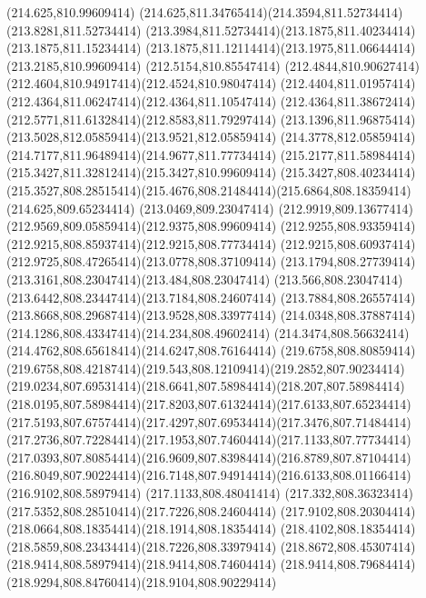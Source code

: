 {{	\lineto(214.625,810.99609414)
	\curveto(214.625,811.34765414)(214.3594,811.52734414)(213.8281,811.52734414)
	\curveto(213.3984,811.52734414)(213.1875,811.40234414)(213.1875,811.15234414)
	\curveto(213.1875,811.12114414)(213.1975,811.06644414)(213.2185,810.99609414)
	\lineto(212.5154,810.85547414)
	\curveto(212.4844,810.90627414)(212.4604,810.94917414)(212.4524,810.98047414)
	\curveto(212.4404,811.01957414)(212.4364,811.06247414)(212.4364,811.10547414)
	\curveto(212.4364,811.38672414)(212.5771,811.61328414)(212.8583,811.79297414)
	\curveto(213.1396,811.96875414)(213.5028,812.05859414)(213.9521,812.05859414)
	\curveto(214.3778,812.05859414)(214.7177,811.96489414)(214.9677,811.77734414)
	\curveto(215.2177,811.58984414)(215.3427,811.32812414)(215.3427,810.99609414)
	\lineto(215.3427,808.40234414)
	\curveto(215.3527,808.28515414)(215.4676,808.21484414)(215.6864,808.18359414)
	\closepath
	\moveto(214.625,809.65234414)
	\lineto(213.0469,809.23047414)
	\curveto(212.9919,809.13677414)(212.9569,809.05859414)(212.9375,808.99609414)
	\curveto(212.9255,808.93359414)(212.9215,808.85937414)(212.9215,808.77734414)
	\curveto(212.9215,808.60937414)(212.9725,808.47265414)(213.0778,808.37109414)
	\curveto(213.1794,808.27739414)(213.3161,808.23047414)(213.484,808.23047414)
	\curveto(213.566,808.23047414)(213.6442,808.23447414)(213.7184,808.24607414)
	\curveto(213.7884,808.26557414)(213.8668,808.29687414)(213.9528,808.33977414)
	\curveto(214.0348,808.37887414)(214.1286,808.43347414)(214.234,808.49602414)
	\curveto(214.3474,808.56632414)(214.4762,808.65618414)(214.6247,808.76164414)
	\closepath
	\moveto(219.6758,808.80859414)
	\curveto(219.6758,808.42187414)(219.543,808.12109414)(219.2852,807.90234414)
	\curveto(219.0234,807.69531414)(218.6641,807.58984414)(218.207,807.58984414)
	\curveto(218.0195,807.58984414)(217.8203,807.61324414)(217.6133,807.65234414)
	\curveto(217.5193,807.67574414)(217.4297,807.69534414)(217.3476,807.71484414)
	\curveto(217.2736,807.72284414)(217.1953,807.74604414)(217.1133,807.77734414)
	\curveto(217.0393,807.80854414)(216.9609,807.83984414)(216.8789,807.87104414)
	\curveto(216.8049,807.90224414)(216.7148,807.94914414)(216.6133,808.01166414)
	\lineto(216.9102,808.58979414)
	\lineto(217.1133,808.48041414)
	\curveto(217.332,808.36323414)(217.5352,808.28510414)(217.7226,808.24604414)
	\curveto(217.9102,808.20304414)(218.0664,808.18354414)(218.1914,808.18354414)
	\curveto(218.4102,808.18354414)(218.5859,808.23434414)(218.7226,808.33979414)
	\curveto(218.8672,808.45307414)(218.9414,808.58979414)(218.9414,808.74604414)
	\curveto(218.9414,808.79684414)(218.9294,808.84760414)(218.9104,808.90229414)
}}

